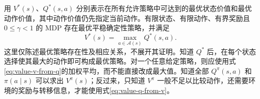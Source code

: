 \documentclass[UTF8,12pt,a4paper,fontset=fandol]{ctexart}
\begin{document}
用 $V^*(s)$、$Q^*(s,a)$ 分别表示在所有允许策略中可达到的最优状态价值和最优动作价值，其中动作价值仍先指定当前动作。有限状态、有限动作、有界奖励且 $0\leq\gamma<1$ 的 MDP 存在最优平稳确定性策略，并满足
\begin{equation}
  V^*(s)=\max_{a\in\mathcal A(s)}Q^*(s,a).
  \label{eq:value-optimal}
\end{equation}
这里仅陈述最优策略存在性及相应关系，不展开其证明。知道 $Q^*$ 后，在每个状态选择使其最大的动作即可构成最优策略。对一个任意给定策略，则应使用式\eqref{eq:value-v-from-q}的加权平均，而不能直接改成最大值。知道全部 $Q^\pi(s,a)$ 和 $\pi(a\mid s)$ 可以求出 $V^\pi(s)$；反过来，只知道 $V^\pi$ 一般不足以比较动作，还需要环境的奖励与转移信息，才能使用式\eqref{eq:value-q-from-v}。
\end{document}
